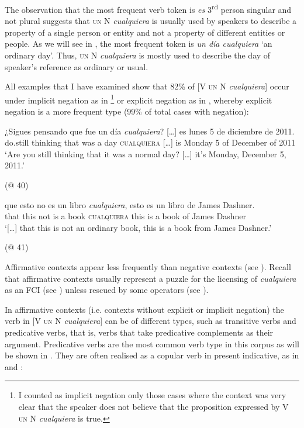 The observation that the most frequent verb token is \textit{es} 3\textsuperscript{rd} person singular and not plural suggests that \textsc{un} N \textit{cualquiera} is usually used by speakers to describe a property of a single person or entity and not a property of different entities or people. As we will see in , the most frequent token is \textit{un día cualquiera} ‘an ordinary day’. Thus, \textsc{un} N \textit{cualquiera} is mostly used to describe the day of speaker’s reference as ordinary or usual.

All examples that I have examined show that 82\% of [V \textsc{un} N \textit{cualquiera}] occur under implicit negation as in  \footnote{{I counted as implicit negation only those cases where the context was very clear that the speaker does not believe that the proposition expressed by V} \textsc{un} {N} {\textit{cualquiera}} {is true.}} or explicit negation as in , whereby explicit negation is a more frequent type (99\% of total cases with negation):

\largerpage[2]
\ea \label{bkm:Ref42868256} %
\gll ¿Sigues pensando que fue un día \textit{cualquiera}? […] es lunes 5 de diciembre de 2011.\\
do.still thinking that was a day \textsc{cualquiera} […] is Monday 5 of December of 2011\\
\glt ‘Are you still thinking that it was a normal day? […] it’s Monday, December 5, 2011.’

  (@ 40)
\z

\ea \label{bkm:Ref42868258} %
\gll […] que esto no es un libro \textit{cualquiera}, esto es un libro de James Dashner.\hspace*{-4mm}\\
[…] that this not is a book \textsc{cualquiera} this is a book of James Dashner\hspace*{-4mm}\\
\glt ‘[…] that this is not an ordinary book, this is a book from James Dashner.’

  (@ 41)
\z\clearpage

Affirmative contexts appear less frequently than negative contexts (see ). Recall that affirmative contexts usually represent a puzzle for the licensing of \textit{cualquiera} as an FCI (see ) unless rescued by some operators (see ).

In affirmative contexts (i.e. contexts without explicit or implicit negation) the verb in [V \textsc{un} N \textit{cualquiera}] can be of different types, such as transitive verbs and predicative verbs, that is, verbs that take predicative complements as their argument. Predicative verbs are the most common verb type in this corpus as will be shown in . They are often realised as a copular verb in present indicative, as in  and :

